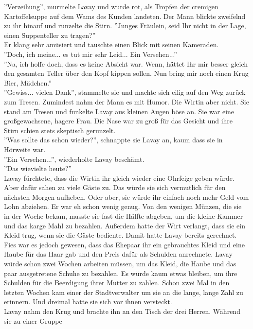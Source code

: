 ''Verzeihung”, murmelte Lavay und wurde rot, als Tropfen der cremigen Kartoffelsuppe auf dem 
Wams des Kunden landeten. Der Mann blickte zweifelnd zu ihr hinauf und runzelte die Stirn.
''Junges Fräulein, seid Ihr nicht in der Lage, einen  Suppenteller zu tragen?”\\
Er klang sehr amüsiert und tauschte einen Blick mit seinen Kameraden.\\
''Doch, ich meine... es tut mir sehr Leid... Ein Versehen...”\\
''Na, ich hoffe doch, dass es keine Absicht war. Wenn, hättet Ihr mir besser gleich den gesamten 
Teller über den Kopf kippen sollen. Nun bring mir noch einen Krug Bier, Mädchen.”\\
''Gewiss... vielen Dank”, stammelte sie und machte sich eilig auf den Weg zurück zum Tresen. 
Zumindest nahm der Mann es mit Humor. Die Wirtin aber nicht. Sie stand am Tresen und funkelte Lavay 
aus kleinen Augen böse an. Sie war eine großgewachsene, hagere Frau. Die Nase war zu groß für das 
Gesicht und ihre Stirn schien stets skeptisch gerunzelt.\\
''Was sollte das schon wieder?”, schnappte sie Lavay an, kaum dass sie in Hörweite war.\\
''Ein Versehen...”, wiederholte Lavay beschämt.\\
''Das wievielte heute?”\\
Lavay fürchtete, dass die Wirtin ihr gleich wieder eine Ohrfeige geben würde. Aber dafür sahen zu 
viele Gäste zu. Das würde sie sich vermutlich für den nächsten Morgen aufheben. Oder aber, sie 
würde ihr einfach noch mehr Geld vom Lohn abziehen. Er war eh schon wenig genug. Von den wenigen 
Münzen, die sie in der Woche bekam, musste sie fast die Hälfte abgeben, um die kleine Kammer und 
das karge Mahl zu bezahlen. Außerdem hatte der Wirt verlangt, dass sie ein Kleid trug, wenn sie die 
Gäste bediente. Damit hatte Lavay bereits gerechnet. Fies war es jedoch gewesen, dass das Ehepaar 
ihr ein gebrauchtes Kleid und eine Haube für das Haar gab und den Preis dafür als Schulden 
anrechnete. Lavay würde schon zwei Wochen arbeiten müssen, um das Kleid, die Haube und das paar 
ausgetretene Schuhe zu bezahlen. Es würde kaum etwas bleiben, um ihre Schulden für die Beerdigung 
ihrer Mutter zu zahlen. Schon zwei Mal in den letzten Wochen kam einer der Stadtverwalter um sie an 
die lange, lange Zahl zu erinnern. Und dreimal hatte sie sich vor ihnen versteckt.\\
Lavay nahm den Krug und brachte ihn an den Tisch der drei Herren. Während sie zu einer Gruppe 
